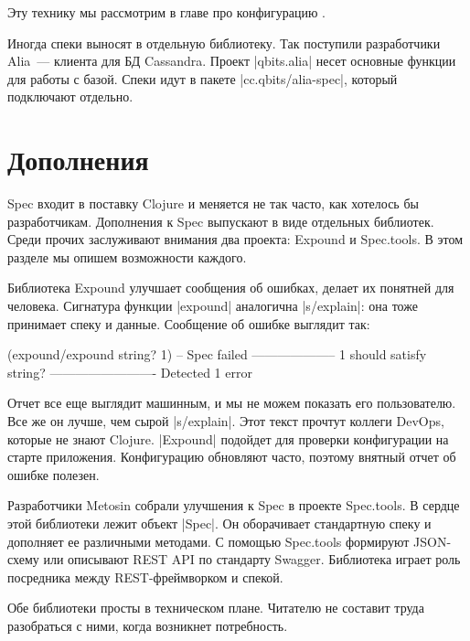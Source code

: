 Эту технику мы рассмотрим в главе про конфигурацию .

Иногда спеки выносят в отдельную библиотеку. Так поступили разработчики
Alia~--- клиента для БД
Cassandra. Проект \spverb|qbits.alia| несет основные функции для работы с
базой. Спеки идут в пакете \spverb|cc.qbits/alia-spec|, который подключают
отдельно.

\section{Дополнения}

Spec входит в поставку Clojure и меняется не так часто, как хотелось бы
разработчикам. Дополнения к Spec выпускают в виде отдельных библиотек. Среди
прочих заслуживают внимания два проекта: Expound и Spec.tools. В этом разделе мы
опишем возможности каждого.

Библиотека Expound улучшает сообщения об
ошибках, делает их понятней для человека. Сигнатура функции \spverb|expound|
аналогична \spverb|s/explain|: она тоже принимает спеку и данные. Сообщение об
ошибке выглядит так:

\begin{english}
  \begin{clojure}
(expound/expound string? 1)
-- Spec failed --------------------
  1
should satisfy
  string?
-------------------------
Detected 1 error
  \end{clojure}
\end{english}

Отчет все еще выглядит машинным, и мы не можем показать его пользователю. Все же
он лучше, чем сырой \spverb|s/explain|. Этот текст прочтут коллеги DevOps,
которые не знают Clojure. \spverb|Expound| подойдет для проверки конфигурации на
старте приложения. Конфигурацию обновляют часто, поэтому внятный отчет об ошибке
полезен.

Разработчики Metosin собрали улучшения к Spec в проекте
Spec.tools. В сердце этой
библиотеки лежит объект \spverb|Spec|. Он оборачивает стандартную спеку и
дополняет ее различными методами. С помощью Spec.tools формируют JSON-схему или
описывают REST API по стандарту Swagger. Библиотека играет роль посредника между
REST-фреймворком и спекой.

Обе библиотеки просты в техническом плане. Читателю не составит труда
разобраться с ними, когда возникнет потребность.

